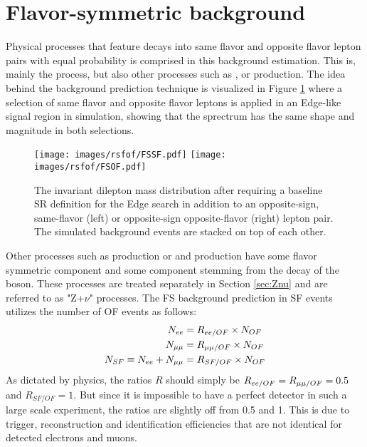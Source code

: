 \section{Flavor-symmetric background}\label{sec:fsBG}
\noindent
\justify
Physical processes that feature decays into same flavor and opposite flavor lepton pairs with equal probability is comprised in this background estimation. 
This is, mainly the \ttbar process, but also other processes such as \PWW, or \ttW production.
The idea behind the background prediction technique is visualized in Figure \ref{fig:rsfofMC} where a selection of same flavor and opposite flavor leptons is applied in an Edge-like signal region in simulation, showing that the \ttbar sprectrum has the same shape and magnitude in both selections.    
\begin{figure}[htbp!]
\begin{center}
    \texttt{[image: images/rsfof/FSSF.pdf]}
    \texttt{[image: images/rsfof/FSOF.pdf]} 
    \caption{The invariant dilepton mass distribution after requiring a baseline SR definition for the Edge search in addition to an opposite-sign, same-flavor (left) or opposite-sign opposite-flavor (right) lepton pair. The simulated background events are stacked on top of each other.}
\label{fig:rsfofMC}
\end{center}
\end{figure}                                                                               
Other processes such as \PWZ production or \ttZ and \ttH production have some flavor symmetric component and some component stemming from the decay of the \PZ boson.
These processes are treated separately in Section \ref{sec:Znu} and are referred to as "Z+$\nu$" processes. 
The FS background prediction in SF events utilizes the number of OF events as follows:
\begin{align}
\label{eq:masterformula}
    N_{ee} & = R_{ee/OF} \times N_{OF}\notag \\
    N_{\mu\mu} & = R_{\mu\mu/OF} \times N_{OF}\notag\\
    N_{SF} \equiv N_{ee} + N_{\mu\mu} & = R_{SF/OF} \times N_{OF}
\end{align}
As dictated by physics, the ratios $R$ should simply be $R_{ee/OF}=R_{\mu\mu/OF}=0.5$ and $R_{SF/OF}=1$.
But since it is impossible to have a perfect detector in such a large scale experiment, the ratios are slightly off from 0.5 and 1. 
This is due to trigger, reconstruction and identification efficiencies that are not identical for detected electrons and muons. 
